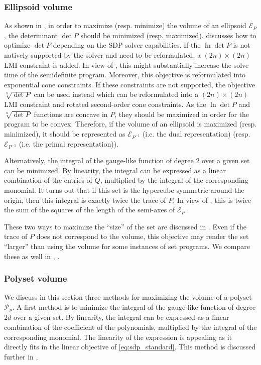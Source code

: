 \documentclass[11pt,twoside,a4paper,openright]{uclouvain-thesis}
\newcommand{\polyset}[1][p]{\mathcal{P}_{#1}}
\begin{document}
\subsubsection{Ellipsoid volume}
\label{sec:ellvol}
As shown in , in order to maximize (resp. minimize) the volume of an ellipsoid
$\mathcal{E}_P$, the determinant $\det P$ should be minimized (resp. maximized).
 discusses how to optimize $\det P$ depending on the SDP solver capabilities.
If the $\ln\det P$ is not natively supported by the solver and need to be reformulated,
a $(2n) \times (2n)$ LMI constraint is added.
In view of , this might substantially increase the solve time of the semidefinite program.
Moreover, this objective is reformulated into exponential cone constraints.
If these constraints are not supported, the objective $\sqrt[n]{\det P}$
can be used instead which can be reformulated into a $(2n) \times (2n)$ LMI constraint
and rotated second-order cone constraints.
As the $\ln\det P$ and $\sqrt[n]{\det P}$ functions are concave in $P$,
they should be maximized in order for the program to be convex.
Therefore, if the volume of an ellipsoid is maximized (resp. minimized),
it should be represented as $\mathcal{E}_{P^{-1}}$ (i.e. the dual representation) (resp. $\mathcal{E}_{P^{-1}}$ (i.e. the primal representation)).

Alternatively, the integral of the gauge-like function of degree 2 over a given set can be minimized.
By linearity, the integral can be expressed as a linear combination of the entries of $Q$, multiplied by the integral of the corresponding monomial.
It turns out that if this set is the hypercube symmetric around the origin,
then this integral is exactly twice the trace of $P$. %
In view of , this is twice the sum of the squares of the length of the semi-axes of $\mathcal{E}_P$.

These two ways to maximize the ``size'' of the set are discussed in \cite{durieu1996trace}.
Even if the trace of $P$ does not correspond to the volume,
this objective may render the set ``larger'' than using the volume for
some instances of set programs.
We compare these as well in , .

\subsubsection{Polyset volume}
\label{sec:polysetvol}

We discuss in this section three methods for maximizing the volume of a polyset $\polyset[p]$.
A first method is to minimize the integral of the gauge-like function of degree $2d$ over a given set.
By linearity, the integral can be expressed as a linear combination of the coefficient of the polynomials, multiplied by the integral of the corresponding monomial.
The linearity of the expression is appealing as it directly fits in the linear objective of \eqref{eq:sdp_standard}.
This method is discussed further in \cite{dabbene2017simple},
\end{document}
